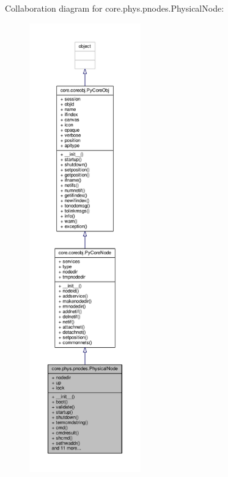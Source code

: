 Collaboration diagram for core.\+phys.\+pnodes.\+Physical\+Node\+:
\nopagebreak
\begin{figure}[H]
\begin{center}
\leavevmode
\includegraphics[height=550pt]{classcore_1_1phys_1_1pnodes_1_1_physical_node__coll__graph}
\end{center}
\end{figure}
